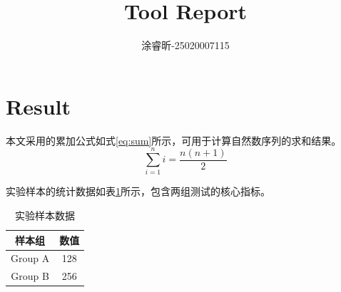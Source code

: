 \documentclass{article}
\begin{document}
\title{Tool Report}
\author{涂睿昕-25020007115}
\maketitle

\section{Result}

本文采用的累加公式如式\eqref{eq:sum}所示，可用于计算自然数序列的求和结果。
\begin{equation}
\label{eq:sum}
\sum_{i=1}^{n} i = \frac{n(n+1)}{2}
\end{equation}

实验样本的统计数据如表\ref{tab:sample}所示，包含两组测试的核心指标。
\begin{table}[htbp]
    \centering
    \caption{实验样本数据}
    \label{tab:sample}
    \begin{tabular}{|c|c|}
        \hline
        样本组 & 数值 \\
        \hline
        Group A & 128 \\
        Group B & 256 \\
        \hline
    \end{tabular}
\end{table}
\end{document}
